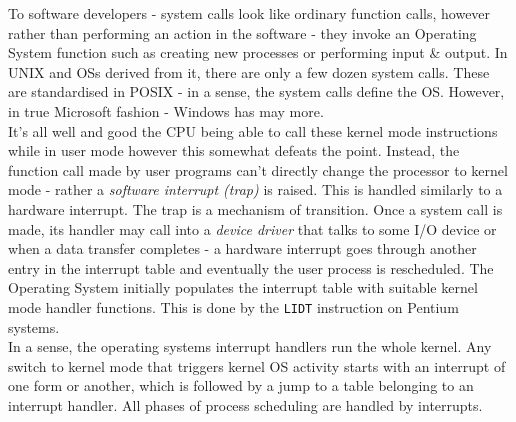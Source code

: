 To software developers - system calls look like ordinary function calls, however rather than performing an action in the software - they invoke an Operating System function such as creating new processes or performing input \& output. In UNIX and OSs derived from it, there are only a few dozen system calls. These are standardised in POSIX - in a sense, the system calls define the OS. However, in true Microsoft fashion - Windows has may more.\\

It's all well and good the CPU being able to call these kernel mode instructions while in user mode however this somewhat defeats the point. Instead, the function call made by user programs can't directly change the processor to kernel mode - rather a \textit{software interrupt (trap)} is raised. This is handled similarly to a hardware interrupt. The trap is a mechanism of transition. Once a system call is made, its handler may call into a \textit{device driver} that talks to some I/O device or when a data transfer completes - a hardware interrupt goes through another entry in the interrupt table and eventually the user process is rescheduled. The Operating System initially populates the interrupt table with suitable kernel mode handler functions. This is done by the \verb|LIDT| instruction on Pentium systems.\\

In a sense, the operating systems interrupt handlers run the whole kernel. Any switch to kernel mode that triggers kernel OS activity starts with an interrupt of one form or another, which is followed by a jump to a table belonging to an interrupt handler. All phases of process scheduling are handled by interrupts.